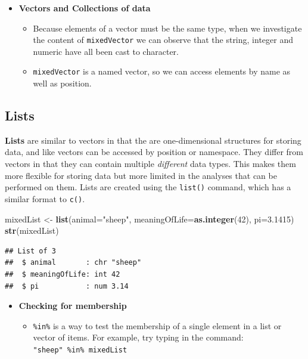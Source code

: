 \documentclass[a4paper]{book}
\newenvironment{Shaded}{\begin{snugshade}}{\end{snugshade}}
\newcommand{\KeywordTok}[1]{\textcolor[rgb]{0.13,0.29,0.53}{\textbf{{#1}}}}
\newcommand{\DataTypeTok}[1]{\textcolor[rgb]{0.13,0.29,0.53}{{#1}}}
\newcommand{\DecValTok}[1]{\textcolor[rgb]{0.00,0.00,0.81}{{#1}}}
\newcommand{\FloatTok}[1]{\textcolor[rgb]{0.00,0.00,0.81}{{#1}}}
\newcommand{\StringTok}[1]{\textcolor[rgb]{0.31,0.60,0.02}{{#1}}}
\newcommand{\NormalTok}[1]{{#1}}
\providecommand{\tightlist}{%
  \setlength{\itemsep}{0pt}\setlength{\parskip}{0pt}}
\renewenvironment{Shaded}
{\vspace{1.5em}\begin{leftbar}\begin{snugshade}}
{\end{snugshade}\end{leftbar}\vspace{3pt}}
\newenvironment{rmdblock}[1]
  {\vspace{1.5em}\begin{shaded*}
  \begin{itemize}
  \renewcommand{\labelitemi}{
    \raisebox{-.7\height}[0pt][0pt]{
      {\setkeys{Gin}{width=3em,keepaspectratio}\texttt{[image: images/\#1]}}
    }
  }
  \item
  }
  {
  \end{itemize}
  \end{shaded*}
  }
\newenvironment{rmdtip}
  {\begin{rmdblock}{tip}}
  {\end{rmdblock}}
\begin{document}
\begin{rmdtip}
\textbf{Vectors and Collections of data}

\begin{itemize}
\tightlist
\item
  Because elements of a vector must be the same type, when we
  investigate the content of \texttt{mixedVector} we can observe that
  the string, integer and numeric have all been cast to character.
\item
  \texttt{mixedVector} is a named vector, so we can access elements by
  name as well as position.
\end{itemize}
\end{rmdtip}

\subsection{Lists}\label{lists}

\textbf{Lists} are similar to vectors in that the are one-dimensional
structures for storing data, and like vectors can be accessed by
position or namespace. They differ from vectors in that they can contain
multiple \emph{different} data types. This makes them more flexible for
storing data but more limited in the analyses that can be performed on
them. Lists are created using the \texttt{list()} command, which has a
similar format to \texttt{c()}.

\begin{Shaded}
\begin{Highlighting}[]
\NormalTok{mixedList <-}\StringTok{ }\KeywordTok{list}\NormalTok{(}\DataTypeTok{animal=}\StringTok{"sheep"}\NormalTok{, }\DataTypeTok{meaningOfLife=}\KeywordTok{as.integer}\NormalTok{(}\DecValTok{42}\NormalTok{), }\DataTypeTok{pi=}\FloatTok{3.1415}\NormalTok{)}
\KeywordTok{str}\NormalTok{(mixedList)}
\end{Highlighting}
\end{Shaded}

\begin{verbatim}
## List of 3
##  $ animal       : chr "sheep"
##  $ meaningOfLife: int 42
##  $ pi           : num 3.14
\end{verbatim}

\begin{rmdtip}
\textbf{Checking for membership}

\begin{itemize}
\tightlist
\item
  \texttt{\%in\%} is a way to test the membership of a single element in
  a list or vector of items. For example, try typing in the command:
  \texttt{"sheep"\ \%in\%\ mixedList}
\end{itemize}
\end{rmdtip}
\end{document}
